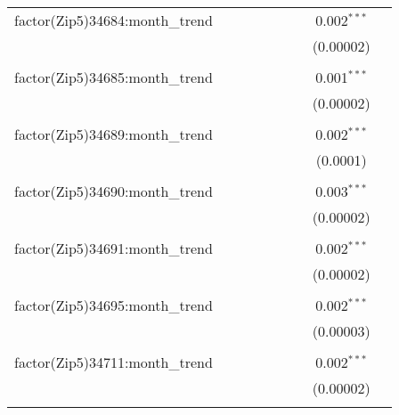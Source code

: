 \begin{table}[H]
{\begin{tabular}{@{\extracolsep{5pt}}lcccccccc}
  factor(Zip5)34684:month\_trend &  &  &  &  &  &  & 0.002$^{***}$ &  \\  

   &  &  &  &  &  &  & (0.00002) &  \\  

   & & & & & & & & \\  

  factor(Zip5)34685:month\_trend &  &  &  &  &  &  & 0.001$^{***}$ &  \\  

   &  &  &  &  &  &  & (0.00002) &  \\  

   & & & & & & & & \\  

  factor(Zip5)34689:month\_trend &  &  &  &  &  &  & 0.002$^{***}$ &  \\  

   &  &  &  &  &  &  & (0.0001) &  \\  

   & & & & & & & & \\  

  factor(Zip5)34690:month\_trend &  &  &  &  &  &  & 0.003$^{***}$ &  \\  

   &  &  &  &  &  &  & (0.00002) &  \\  

   & & & & & & & & \\  

  factor(Zip5)34691:month\_trend &  &  &  &  &  &  & 0.002$^{***}$ &  \\  

   &  &  &  &  &  &  & (0.00002) &  \\  

   & & & & & & & & \\  

  factor(Zip5)34695:month\_trend &  &  &  &  &  &  & 0.002$^{***}$ &  \\  

   &  &  &  &  &  &  & (0.00003) &  \\  

   & & & & & & & & \\  

  factor(Zip5)34711:month\_trend &  &  &  &  &  &  & 0.002$^{***}$ &  \\  

   &  &  &  &  &  &  & (0.00002) &  \\  

   & & & & & & & & \\  


\end{tabular}}
\end{table}
